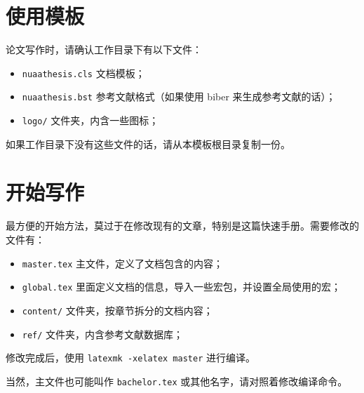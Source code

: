 \section{使用模板}

论文写作时，请确认工作目录下有以下文件：
\begin{itemize}
  \item \verb|nuaathesis.cls| 文档模板；
  \item \verb|nuaathesis.bst| 参考文献格式（如果使用 biber 来生成参考文献的话）；
  \item \verb|logo/| 文件夹，内含一些图标；
\end{itemize}

如果工作目录下没有这些文件的话，请从本模板根目录复制一份。

\section{开始写作}

最方便的开始方法，莫过于在修改现有的文章，特别是这篇快速手册。需要修改的文件有：
\begin{itemize}
  \item \verb|master.tex| 主文件，定义了文档包含的内容；
  \item \verb|global.tex| 里面定义文档的信息，导入一些宏包，并设置全局使用的宏；
  \item \verb|content/| 文件夹，按章节拆分的文档内容；
  \item \verb|ref/| 文件夹，内含参考文献数据库；
\end{itemize}

修改完成后，使用 \verb|latexmk -xelatex master| 进行编译。

当然，主文件也可能叫作 \verb|bachelor.tex| 或其他名字，请对照着修改编译命令。
